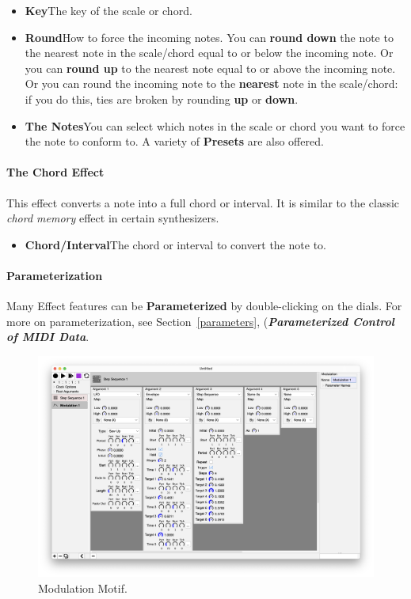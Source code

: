 \documentclass[twoside,10pt]{article}
\begin{document}
\begin{itemize}
\item {\bf Key}\qquad The key of the scale or chord.
\item {\bf Round}\qquad How to force the incoming notes. You can {\bf round down} the note to the nearest note in the scale/chord equal to or below the incoming note.  Or you can {\bf round up} to the nearest note equal to or above the incoming note.  Or you can round the incoming note to the {\bf nearest} note in the scale/chord: if you do this, ties are broken by rounding {\bf up} or {\bf down}.
\item {\bf The Notes}\qquad You can select which notes in the scale or chord you want to force the note to conform to.  A variety of {\bf Presets} are also offered.
\end{itemize}

\paragraph{The Chord Effect}

This effect converts a note into a full chord or interval.  It is similar to the classic {\it chord memory} effect in certain synthesizers.

\begin{itemize}
\item {\bf Chord/Interval}\qquad The chord or interval to convert the note to.
\end{itemize}



\paragraph{Parameterization}

Many Effect features can be {\bf Parameterized} by double-clicking on the dials.  For more on parameterization, see Section~\ref{parameters}, (\textbf{\textit{Parameterized Control of MIDI Data}}.



\clearpage

\begin{figure}[t]
\centering
\includegraphics[width=6.5in]{Modulation}
\vspace{-2em}
\caption{Modulation Motif.}
\label{filter}
\end{figure}
\end{document}
